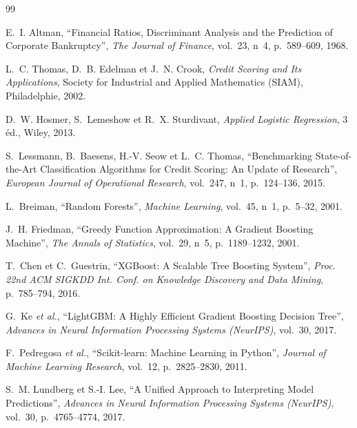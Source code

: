 \documentclass[a4paper,12pt,oneside]{report}
\begin{document}
\begin{thebibliography}{99}

 E.~I. Altman, ``Financial Ratios, Discriminant Analysis and the
  Prediction of Corporate Bankruptcy'', \emph{The Journal of Finance}, vol.~23, n~4,
  p.~589--609, 1968.

 L.~C. Thomas, D.~B. Edelman et J.~N. Crook, \emph{Credit Scoring and
  Its Applications}, Society for Industrial and Applied Mathematics (SIAM), Philadelphie, 2002.

 D.~W. Hosmer, S.~Lemeshow et R.~X. Sturdivant, \emph{Applied Logistic
  Regression}, 3 éd., Wiley, 2013.

 S.~Lessmann, B.~Baesens, H.-V. Seow et L.~C. Thomas, ``Benchmarking
  State-of-the-Art Classification Algorithms for Credit Scoring: An Update of Research'',
  \emph{European Journal of Operational Research}, vol.~247, n~1, p.~124--136, 2015.

 L.~Breiman, ``Random Forests'', \emph{Machine Learning}, vol.~45,
  n~1, p.~5--32, 2001.

 J.~H. Friedman, ``Greedy Function Approximation: A Gradient Boosting
  Machine'', \emph{The Annals of Statistics}, vol.~29, n~5, p.~1189--1232, 2001.

 T.~Chen et C.~Guestrin, ``XGBoost: A Scalable Tree Boosting System'',
  \emph{Proc. 22nd ACM SIGKDD Int. Conf. on Knowledge Discovery and Data Mining},
  p.~785--794, 2016.

 G.~Ke \textit{et al.}, ``LightGBM: A Highly Efficient Gradient Boosting
  Decision Tree'', \emph{Advances in Neural Information Processing Systems (NeurIPS)},
  vol.~30, 2017.

 F.~Pedregosa \textit{et al.}, ``Scikit-learn: Machine Learning in
  Python'', \emph{Journal of Machine Learning Research}, vol.~12, p.~2825--2830, 2011.

 S.~M. Lundberg et S.-I. Lee, ``A Unified Approach to Interpreting Model
  Predictions'', \emph{Advances in Neural Information Processing Systems (NeurIPS)}, vol.~30,
  p.~4765--4774, 2017.


\end{thebibliography}
\end{document}
